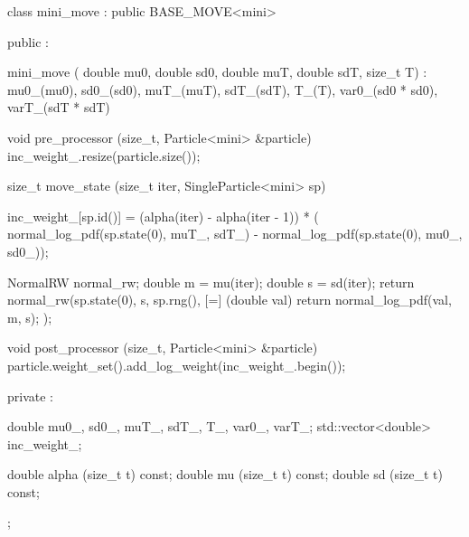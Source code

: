 \begin{cppcode}
class mini_move : public BASE_MOVE<mini>
{
  public :

  mini_move (
      double mu0, double sd0,
      double muT, double sdT, size_t T) :
    mu0_(mu0), sd0_(sd0), muT_(muT), sdT_(sdT), T_(T),
    var0_(sd0 * sd0), varT_(sdT * sdT) {}

  void pre_processor (size_t, Particle<mini> &particle)
  {
    inc_weight_.resize(particle.size());
  }

  size_t move_state (size_t iter, SingleParticle<mini> sp)
  {
    inc_weight_[sp.id()] =
      (alpha(iter) - alpha(iter - 1)) * (
          normal_log_pdf(sp.state(0), muT_, sdT_) -
          normal_log_pdf(sp.state(0), mu0_, sd0_));

    NormalRW normal_rw;
    double m = mu(iter);
    double s = sd(iter);
    return normal_rw(sp.state(0), s, sp.rng(),
        [=] (double val) {
          return normal_log_pdf(val, m, s);
        });
  }

  void post_processor (size_t, Particle<mini> &particle)
  {
    particle.weight_set().add_log_weight(inc_weight_.begin());
  }

  private :

  double mu0_, sd0_, muT_, sdT_, T_, var0_, varT_;
  std::vector<double> inc_weight_;

  double alpha (size_t t) const;
  double mu (size_t t) const;
  double sd (size_t t) const;
};
\end{cppcode}
